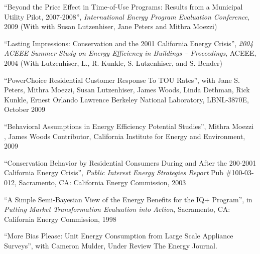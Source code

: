 \documentclass[Computer Science]{vita}
\begin{document}
\begin{vita}
\begin{Selected Publications}
\begin{Papers at Refereed Conferences}
   \item ``Beyond the Price Effect in Time-of-Use Programs: Results
      from a Municipal Utility Pilot, 2007-2008'', \emph{International
        Energy Program Evaluation Conference}, 2009 (With with Susan
      Lutzenhiser, Jane Peters and Mithra Moezzi)

   \item ``Lasting Impressions: Conservation and the 2001 California
      Energy Crisis'', \emph{2004 ACEEE Summer Study on Energy
        Efficiency in Buildings -- Proceedings}, ACEEE, 2004 (With
      Lutzenhiser, L., R. Kunkle, S. Lutzenhiser, and S. Bender)

    
    
    \end{Papers at Refereed Conferences}
   
    \begin{Unrefereed Public Reports}
    
    \item ``PowerChoice Residential Customer Response To TOU Rates'',
      with Jane S. Peters, Mithra Moezzi, Susan Lutzenhiser, James
      Woods, Linda Dethman, Rick Kunkle, Ernest Orlando Lawrence
      Berkeley National Laboratory, LBNL-3870E, October 2009

    \item ``Behavioral Assumptions in Energy Efficiency Potential
      Studies'', Mithra Moezzi , James Woods Contributor, California
      Institute for Energy and Environment, 2009

    \item ``Conservation Behavior by Residential Consumers During and
      After the 200-2001 California Energy Crisis'', \emph{Public
        Interest Energy Strategies Report} Pub \#100-03-012,
      Sacramento, CA: California Energy Commission, 2003

	
    \item ``A Simple Semi-Bayesian View of the Energy Benefits for the
      IQ+ Program'', in \emph{Putting Market Transformation Evaluation
        into Action}, Sacramento, CA: California Energy Commission,
      1998
	
    \end{Unrefereed Public Reports}

\begin{Working Papers}

\item ``More Bias Please: Unit Energy Consumption from Large Scale Appliance Surveys'', with Cameron Mulder, Under Review The Energy Journal.


\end{Working Papers}
\end{Selected Publications}
\end{vita}
\end{document}
